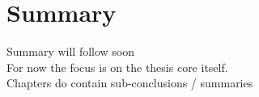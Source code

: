\chapter*{Summary}


Summary will follow soon \\

For now the focus is on the thesis core itself. \\
Chapters do contain sub-conclusions / summaries 
